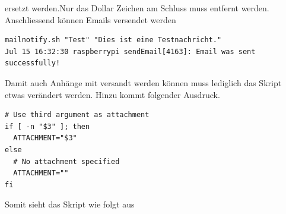 \documentclass[11pt,a4paper]{article} %
\begin{document}
ersetzt werden.Nur das Dollar Zeichen am Schluss muss entfernt werden. Anschliessend können Emails versendet werden
\begin{frame}

\begin{lstlisting}
mailnotify.sh "Test" "Dies ist eine Testnachricht."
Jul 15 16:32:30 raspberrypi sendEmail[4163]: Email was sent successfully!

\end{lstlisting}
\end{frame}
\par
Damit auch Anhänge mit versandt werden können muss lediglich das Skript etwas verändert werden.
Hinzu kommt folgender Ausdruck. \cite{11}
\begin{frame}

\begin{lstlisting}
# Use third argument as attachment
if [ -n "$3" ]; then
  ATTACHMENT="$3"
else
  # No attachment specified
  ATTACHMENT=""
fi

\end{lstlisting}
\end{frame}
\newpage
Somit sieht das Skript wie folgt aus
\end{document}
